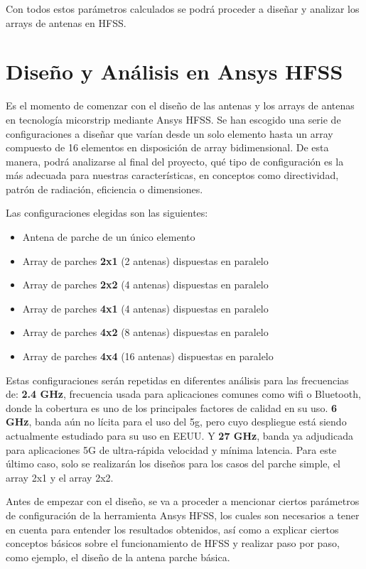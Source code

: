 \par Con todos estos parámetros calculados se podrá proceder a diseñar y analizar los arrays de antenas en HFSS.

\section{Diseño y Análisis en Ansys HFSS}

\par Es el momento de comenzar con el diseño de las antenas y los arrays de antenas en tecnología micorstrip mediante Ansys HFSS. Se han escogido una serie de configuraciones a diseñar que varían desde un solo elemento hasta un array compuesto de 16 elementos en disposición de array bidimensional. De esta manera, podrá analizarse al final del proyecto, qué tipo de configuración es la más adecuada para nuestras características, en conceptos como directividad, patrón de radiación, eficiencia o dimensiones.
\\
\par Las configuraciones elegidas son las siguientes:

\begin{itemize}
\item Antena de parche de un único elemento
\item Array de parches \textbf{2x1} (2 antenas) dispuestas en paralelo
\item Array de parches \textbf{2x2} (4 antenas) dispuestas en paralelo
\item Array de parches \textbf{4x1} (4 antenas) dispuestas en paralelo
\item Array de parches \textbf{4x2} (8 antenas) dispuestas en paralelo
\item Array de parches \textbf{4x4} (16 antenas) dispuestas en paralelo
\end{itemize}

\par Estas configuraciones serán repetidas en diferentes análisis para las frecuencias de: \textbf{2.4 GHz}, frecuencia usada para aplicaciones comunes como \gls{wifi} o Bluetooth, donde la cobertura es uno de los principales factores de calidad en su uso. \textbf{6 GHz}, banda aún no lícita para el uso del \gls{5g}, pero cuyo despliegue está siendo actualmente estudiado para su uso en EEUU. Y \textbf{27 GHz}, banda ya adjudicada para aplicaciones 5G de ultra-rápida velocidad y mínima latencia. Para este último caso, solo se realizarán los diseños para los casos del parche simple, el array 2x1 y el array 2x2.
\\
\par Antes de empezar con el diseño, se va a proceder a mencionar ciertos parámetros de configuración de la herramienta Ansys HFSS, los cuales son necesarios a tener en cuenta para entender los resultados obtenidos, así como a explicar ciertos conceptos básicos sobre el funcionamiento de HFSS y realizar paso por paso, como ejemplo, el diseño de la antena parche básica.


